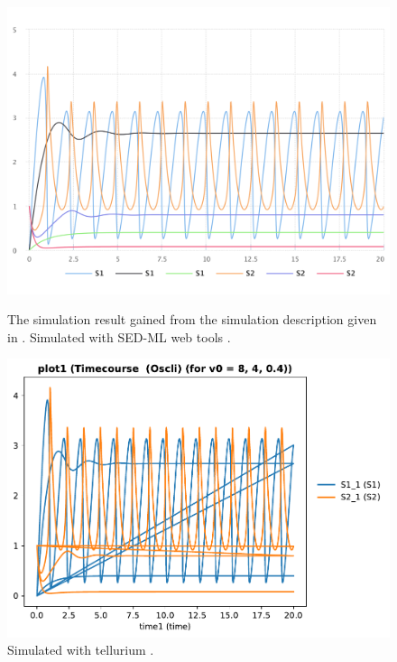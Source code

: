 \begin{figure}[ht]
    \centering
    \begin{minipage}{0.47\textwidth}
        \centering
        \includegraphics[width=1.0\textwidth]{examples/repeated-scan-oscli/results/sedml_webtools/plot1}
        \caption{The simulation result gained from the simulation description given in . Simulated with SED-ML web tools \citep{bergmann2017sed}.}
    \end{minipage}\hfill
    \begin{minipage}{0.47\textwidth}
        \centering
                \includegraphics[width=1.0\textwidth]{examples/repeated-scan-oscli/results/tellurium/plot1}
        \caption{Simulated with tellurium \citep{tellurium}.}
    \end{minipage}
    \label{fig:repeated-scan-oscli}
\end{figure}

